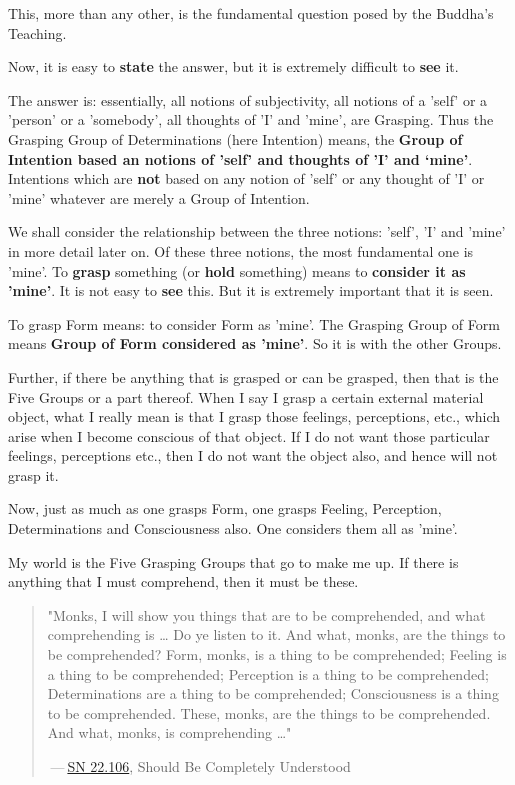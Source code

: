 This, more than any other, is the fundamental question posed by the
Buddha’s Teaching.


Now, it is easy to \textbf{state} the answer, but it is extremely difficult to
\textbf{see} it.


The answer is: essentially, all notions of subjectivity, all notions of
a 'self' or a 'person' or a 'somebody', all thoughts of 'I' and 'mine',
are Grasping. Thus the Grasping Group of Determinations (here Intention)
means, the \textbf{Group of Intention based an notions of 'self' and thoughts
of 'I' and `mine'}. Intentions which are \textbf{not} based on any notion of
'self' or any thought of 'I' or 'mine' whatever are merely a Group of
Intention.


We shall consider the relationship between the three notions: 'self',
'I' and 'mine' in more detail later on. Of these three notions, the most
fundamental one is 'mine'. To \textbf{grasp} something (or \textbf{hold} something)
means to \textbf{consider it as 'mine'}. It is not easy to \textbf{see} this. But it
is extremely important that it is seen.


To grasp Form means: to consider Form as 'mine'. The Grasping Group of
Form means \textbf{Group of Form considered as 'mine'}. So it is with the
other Groups.


Further, if there be anything that is grasped or can be grasped, then
that is the Five Groups or a part thereof. When I say I grasp a certain
external material object, what I really mean is that I grasp those
feelings, perceptions, etc., which arise when I become conscious of that
object. If I do not want those particular feelings, perceptions etc.,
then I do not want the object also, and hence will not grasp it.


Now, just as much as one grasps Form, one grasps Feeling, Perception,
Determinations and Consciousness also. One considers them all as 'mine'.


My world is the Five Grasping Groups that go to make me up. If there is
anything that I must comprehend, then it must be these.


\begin{quotation}
"Monks, I will show you things that are to be comprehended, and what
comprehending is …​ Do ye listen to it. And what, monks, are the things
to be comprehended? Form, monks, is a thing to be comprehended; Feeling
is a thing to be comprehended; Perception is a thing to be comprehended;
Determinations are a thing to be comprehended; Consciousness is a thing
to be comprehended. These, monks, are the things to be comprehended. And
what, monks, is comprehending …​"


 — \href{https://suttacentral.net/sn22.106/en/sujato}{SN 22.106}, Should Be Completely Understood


\end{quotation}

